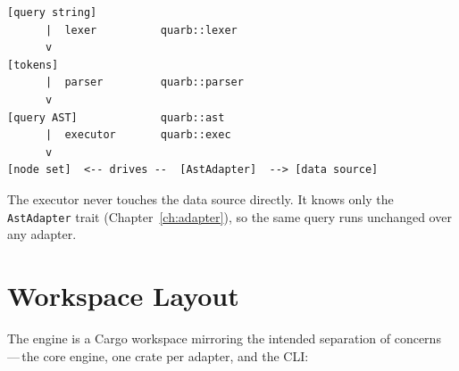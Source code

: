 \documentclass{report}
\begin{document}
\begin{lstlisting}
[query string]
      |  lexer          quarb::lexer
      v
[tokens]
      |  parser         quarb::parser
      v
[query AST]             quarb::ast
      |  executor       quarb::exec
      v
[node set]  <-- drives --  [AstAdapter]  --> [data source]
\end{lstlisting}

\noindent
The executor never touches the data source directly. It knows only
the \texttt{AstAdapter} trait (Chapter~\ref{ch:adapter}), so the same
query runs unchanged over any adapter.

\section{Workspace Layout}

The engine is a Cargo workspace mirroring the intended separation of
concerns\,---\,the core engine, one crate per adapter, and the CLI:
\end{document}

